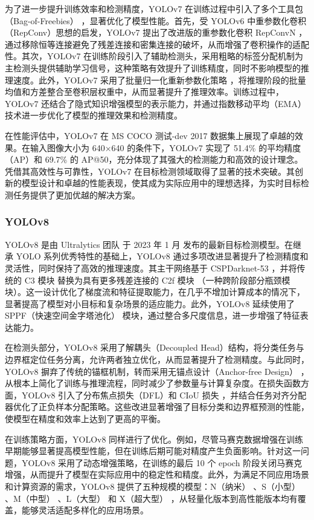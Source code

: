 \documentclass[11pt,twocolumn]{ctexart}
\begin{document}
为了进一步提升训练效率和检测精度，YOLOv7 在训练过程中引入了多个工具包（Bag-of-Freebies） ，显著优化了模型性能。首先，受 YOLOv6 中重参数化卷积（RepConv）思想的启发，YOLOv7 提出了改进版的重参数化卷积 RepConvN ，通过移除恒等连接避免了残差连接和密集连接的破坏，从而增强了卷积操作的适配性。其次，YOLOv7 在训练阶段引入了辅助检测头，采用粗略的标签分配机制为主检测头提供辅助学习信号，这种策略有效提升了训练精度，同时不影响模型的推理速度。此外，YOLOv7 采用了批量归一化重新参数化策略 ，将推理阶段的批量均值和方差整合至卷积层权重中，从而显著提升了推理效率。训练过程中，YOLOv7 还结合了隐式知识增强模型的表示能力，并通过指数移动平均（EMA）技术进一步优化了模型的推理效果和检测精度。

在性能评估中，YOLOv7 在 MS COCO 测试-dev 2017 数据集上展现了卓越的效果。在输入图像大小为 640×640 的条件下，YOLOv7 实现了 51.4\% 的平均精度（AP）和 69.7\% 的 AP@50，充分体现了其强大的检测能力和高效的设计理念。凭借其高效性与可靠性，YOLOv7 在目标检测领域取得了显著的技术突破。其创新的模型设计和卓越的性能表现，使其成为实际应用中的理想选择，为实时目标检测任务提供了更加优越的解决方案。
\subsubsection{YOLOv8}
YOLOv8\cite{yolov8} 是由 Ultralytics 团队 于 2023 年 1 月 发布的最新目标检测模型。在继承 YOLO 系列优秀特性的基础上，YOLOv8 通过多项改进显著提升了检测精度和灵活性，同时保持了高效的推理速度。其主干网络基于 CSPDarknet-53 ，并将传统的 C3 模块 替换为具有更多残差连接的 C2f 模块 （一种跨阶段部分瓶颈模块）。这一设计优化了梯度流和特征提取能力，在几乎不增加计算成本的情况下，显著提高了模型对小目标和复杂场景的适应能力。此外，YOLOv8 延续使用了 SPPF（快速空间金字塔池化） 模块，通过整合多尺度信息，进一步增强了特征表达能力。

在检测头部分，YOLOv8 采用了解耦头（Decoupled Head）结构，将分类任务与边界框定位任务分离，允许两者独立优化，从而显著提升了检测精度。与此同时，YOLOv8 摒弃了传统的锚框机制，转而采用无锚点设计（Anchor-free Design） ，从根本上简化了训练与推理流程，同时减少了参数量与计算复杂度。在损失函数方面，YOLOv8 引入了分布焦点损失（DFL）和 CIoU 损失 ，并结合任务对齐分配器优化了正负样本分配策略。这些改进显著增强了目标分类和边界框预测的性能，使模型在精度和效率上达到了更高的平衡。

在训练策略方面，YOLOv8 同样进行了优化。例如，尽管马赛克数据增强在训练早期能够显著提高模型性能，但在训练后期可能对精度产生负面影响。针对这一问题，YOLOv8 采用了动态增强策略，在训练的最后 10 个 epoch 阶段关闭马赛克增强，从而提升了模型在实际应用中的稳定性和精度。此外，为满足不同应用场景和计算资源的需求，YOLOv8 提供了五种规模的模型：N（纳米） 、S（小型） 、M（中型） 、L（大型） 和 X（超大型） ，从轻量化版本到高性能版本均有覆盖，能够灵活适配多样化的应用场景。
\end{document}
